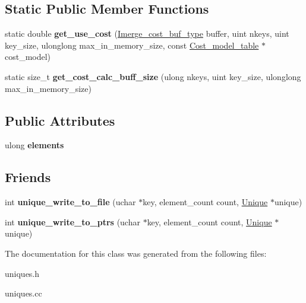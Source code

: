 \subsection*{Static Public Member Functions}
\begin{DoxyCompactItemize}
\item 
\mbox{\label{classUnique_a91ec0483ef3ddc8d07078769d6f0b35d}} 
static double {\bfseries get\+\_\+use\+\_\+cost} (\mbox{\hyperlink{classBounds__checked__array}{Imerge\+\_\+cost\+\_\+buf\+\_\+type}} buffer, uint nkeys, uint key\+\_\+size, ulonglong max\+\_\+in\+\_\+memory\+\_\+size, const \mbox{\hyperlink{classCost__model__table}{Cost\+\_\+model\+\_\+table}} $\ast$cost\+\_\+model)
\item 
\mbox{\label{classUnique_a914d20561195c1ef0c5f17c56fe3163b}} 
static size\+\_\+t {\bfseries get\+\_\+cost\+\_\+calc\+\_\+buff\+\_\+size} (ulong nkeys, uint key\+\_\+size, ulonglong max\+\_\+in\+\_\+memory\+\_\+size)
\end{DoxyCompactItemize}
\subsection*{Public Attributes}
\begin{DoxyCompactItemize}
\item 
\mbox{\label{classUnique_a783743aacb933eb6ba875b75fc3300ab}} 
ulong {\bfseries elements}
\end{DoxyCompactItemize}
\subsection*{Friends}
\begin{DoxyCompactItemize}
\item 
\mbox{\label{classUnique_af2f1f59bf52852031f50d00bac15f6f1}} 
int {\bfseries unique\+\_\+write\+\_\+to\+\_\+file} (uchar $\ast$key, element\+\_\+count count, \mbox{\hyperlink{classUnique}{Unique}} $\ast$unique)
\item 
\mbox{\label{classUnique_a7e910162199158e5f8916c6c30247447}} 
int {\bfseries unique\+\_\+write\+\_\+to\+\_\+ptrs} (uchar $\ast$key, element\+\_\+count count, \mbox{\hyperlink{classUnique}{Unique}} $\ast$unique)
\end{DoxyCompactItemize}


The documentation for this class was generated from the following files\+:\begin{DoxyCompactItemize}
\item 
uniques.\+h\item 
uniques.\+cc\end{DoxyCompactItemize}
